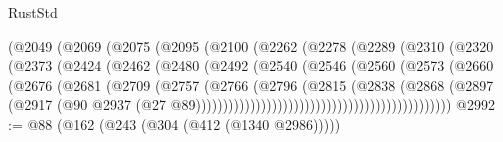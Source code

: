 \begin{lexlean}{RustStd}
\begin{coremodule}
                                (@2049
                                  (@2069
                                    (@2075
                                      (@2095
                                        (@2100
                                          (@2262
                                            (@2278
                                              (@2289
                                                (@2310
                                                  (@2320
                                                    (@2373
                                                      (@2424
                                                        (@2462
                                                          (@2480
                                                            (@2492
                                                              (@2540
                                                                (@2546
                                                                  (@2560
                                                                    (@2573
                                                                      (@2660
                                                                        (@2676
                                                                          (@2681
                                                                            (@2709
                                                                              (@2757
                                                                                (@2766
                                                                                  (@2796
                                                                                    (@2815
                                                                                      (@2838
                                                                                        (@2868
                                                                                          (@2897
                                                                                            (@2917
                                                                                              (@90
                                                                                                @2937
                                                                                                (@27
                                                                                                  @89)))))))))))))))))))))))))))))))))))))))))))))))
@2992 := @88 (@162 (@243 (@304 (@412 (@1340 @2986)))))

\end{coremodule}
\end{lexlean}

